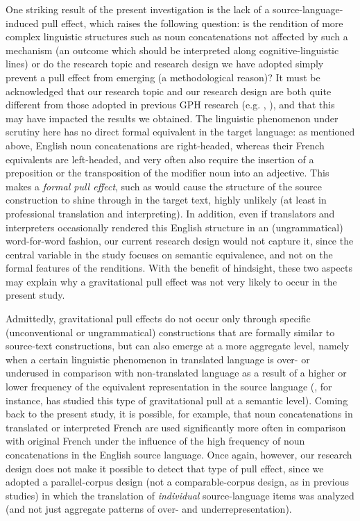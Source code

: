 \documentclass[output=paper]{langscibook}
\begin{document}
\begin{sloppypar}
One striking result of the present investigation is the lack of a source-language-induced pull effect, which raises the following question: is the rendition of more complex linguistic structures such as noun concatenations not affected by such a mechanism (an outcome which should be interpreted along cognitive-linguistic lines) or do the research topic and research design we have adopted simply prevent a pull effect from emerging (a methodological reason)? It must be acknowledged that our research topic and our research design are both quite different from those adopted in previous GPH research (e.g. \citealt{Halverson2017}, \citealt{Marco2021}), and that this may have impacted the results we obtained. The linguistic phenomenon under scrutiny here has no direct formal equivalent in the target language: as mentioned above, English noun concatenations are right-headed, whereas their French equivalents are left-headed, and very often also require the insertion of a preposition or the transposition of the modifier noun into an adjective. This makes a \textit{formal pull effect}, such as would cause the structure of the source construction to shine through in the target text, highly unlikely (at least in professional translation and interpreting). In addition, even if translators and interpreters occasionally rendered this English structure in an (ungrammatical) word-for-word fashion, our current research design would not capture it, since the central variable in the study focuses on semantic equivalence, and not on the formal features of the renditions. With the benefit of hindsight, these two aspects may explain why a gravitational pull effect was not very likely to occur in the present study.

Admittedly, gravitational pull effects do not occur only through specific (unconventional or ungrammatical) constructions that are formally similar to source-text constructions, but can also emerge at a more aggregate level, namely when a certain linguistic phenomenon in translated language is over- or underused in comparison with non-translated language as a result of a higher or lower frequency of the equivalent representation in the source language (\citealt{Halverson2017}, for instance, has studied this type of gravitational pull at a semantic level). Coming back to the present study, it is possible, for example, that noun concatenations in translated or interpreted French are used significantly more often in comparison with original French under the influence of the high frequency of noun concatenations in the English source language. Once again, however, our research design does not make it possible to detect that type of pull effect, since we adopted a parallel-corpus design (not a comparable-corpus design, as in previous studies) in which the translation of \textit{individual} source-language items was analyzed (and not just aggregate patterns of over- and underrepresentation).
\end{sloppypar}
\end{document}
